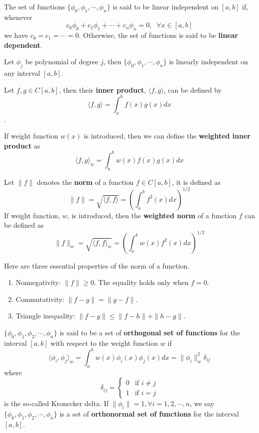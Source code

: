 \begin{definition} 
	The set of functions $\{ \phi_0, \phi_1,\cdots, \phi_n \}$ is said to be linear independent on $[a,b]$ if, whenever
	\[ c_0\phi_0 + c_1\phi_1 + \cdots + c_n\phi_n = 0,\;\; \forall x\in[a,b] \]
	we have $c_0 = c_1 = \cdots = 0$. Otherwise, the set of functions is said to be \textbf{linear dependent}. 
\end{definition}

\begin{ex}
	Let $\phi_j$ be polynomial of degree $j$, then $\{ \phi_0, \phi_1,\cdots, \phi_n \}$ is linearly independent on any interval $[a,b]$.
\end{ex}

\begin{definition}
	Let $f,g\in C[a,b]$, then their \textbf{inner product}, $\langle f, g \rangle$, can be defined by
	\[ \langle f, g \rangle = \int_a^b f(x)g(x)dx \].
	
	If weight function $w(x)$ is introduced, then we can define the \textbf{weighted inner product} as 
	\[ \langle f, g \rangle_w = \int_a^b w(x)f(x)g(x)dx \]
\end{definition}

\begin{definition}
	Let $\| f\|$ denotes the \textbf{norm} of a function $f\in C[a,b]$, it is defined as 
	\[ \|f\| =  \sqrt{\langle f, f \rangle} = \left(\int_a^b f^2(x)dx\right)^{1/2} \]
	If weight function, $w$, is introduced, then the \textbf{weighted norm} of a function $f$ can be defined as
	\[ \|f\|_w =  \sqrt{\langle f, f \rangle_w} = \left(\int_a^b w(x)f^2(x)dx\right)^{1/2} \]
\end{definition}
\begin{property}
	Here are three essential properties of the norm of a function.
	\begin{enumerate}
		\item Nonnegativity: $\|f\| \geq 0$. The equality holds only when $f=0$.
		\item Commutativity: $\|f-g\| = \|g-f\|$.
		\item Triangle inequality: $\|f-g\| \leq \|f-h\| + \|h-g\|$.
	\end{enumerate}
\end{property}

\begin{definition}
	$\{\phi_0, \phi_1, \phi_2,\cdots, \phi_n\}$ is said to be a set of \textbf{orthogonal set of functions} for the interval $[a,b]$ with respect to the weight function $w$ if 
	\[ \langle \phi_i, \phi_j \rangle_w = \int_a^b w(x)\phi_i(x)\phi_j(x)dx = \|\phi_i\|_w^2\delta_{ij} \]
	where
	\[ \delta_{ij} = \begin{cases}
	0& \text{if $i\neq j$}\\
	1& \text{if $i=j$}
	\end{cases}\]
	is the so-called Kronecker delta. If $\|\phi_i\|=1, \forall i=1,2,\cdots,n$, we say $\{\phi_0, \phi_1, \phi_2,\cdots, \phi_n\}$ is a set of \textbf{orthonormal set of functions} for the interval $[a,b]$.
\end{definition}

